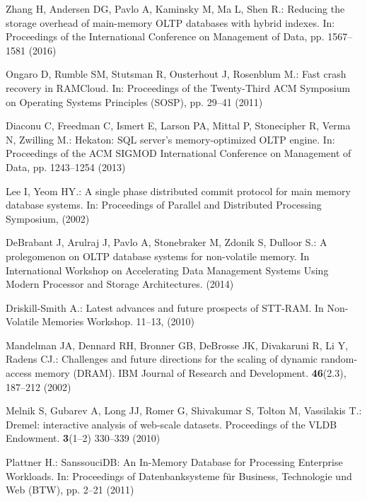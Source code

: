 Zhang H, Andersen DG, Pavlo A, Kaminsky M, Ma L, Shen R.: Reducing the storage overhead of main-memory OLTP databases with hybrid indexes. In: Proceedings of the International Conference on Management of Data, pp. 1567--1581 (2016)

Ongaro D, Rumble SM, Stutsman R, Ousterhout J, Rosenblum M.: Fast crash recovery in RAMCloud. In: Proceedings of the Twenty-Third ACM Symposium on Operating Systems Principles (SOSP), pp. 29--41 (2011)


Diaconu C, Freedman C, Ismert E, Larson PA, Mittal P, Stonecipher R, Verma N, Zwilling M.: Hekaton: SQL server's memory-optimized OLTP engine. In: Proceedings of the ACM SIGMOD International Conference on Management of Data, pp. 1243--1254 (2013)

Lee I, Yeom HY.: A single phase distributed commit protocol for main memory database systems. In: Proceedings of Parallel and Distributed Processing Symposium, (2002)

DeBrabant J, Arulraj J, Pavlo A, Stonebraker M, Zdonik S, Dulloor S.: A prolegomenon on OLTP database systems for non-volatile memory. In International Workshop on Accelerating Data Management Systems Using Modern Processor and Storage Architectures. (2014)

Driskill-Smith A.: Latest advances and future prospects of STT-RAM. In Non-Volatile Memories Workshop. 11--13, (2010)

Mandelman JA, Dennard RH, Bronner GB, DeBrosse JK, Divakaruni R, Li Y, Radens CJ.: Challenges and future directions for the scaling of dynamic random-access memory (DRAM). IBM Journal of Research and Development. \textbf{46}(2.3), 187--212 (2002)

Melnik S, Gubarev A, Long JJ, Romer G, Shivakumar S, Tolton M, Vassilakis T.: Dremel: interactive analysis of web-scale datasets. Proceedings of the VLDB Endowment.  \textbf{3}(1--2) 330--339 (2010)

Plattner H.: SanssouciDB: An In-Memory Database for Processing Enterprise Workloads. In: Proceedings of Datenbanksysteme f\"{u}r Business, Technologie und Web (BTW), pp. 2--21 (2011)

